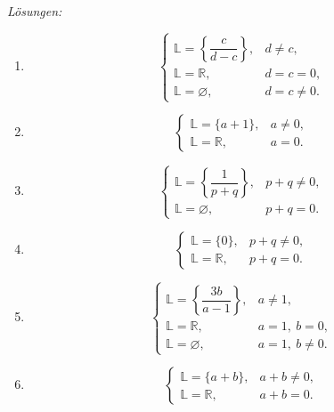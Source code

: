 \clearpage
\emph{Lösungen:}
\begin{enumerate}
    \item
          \[
              \begin{cases}
                  \mathbb{L}=\left\{\dfrac{c}{d-c}\right\}, & d\neq c,  \\[1ex]
                  \mathbb{L}=\mathbb{R},                    & d=c=0,    \\
                  \mathbb{L}=\varnothing,                   & d=c\neq0.
              \end{cases}
          \]

    \item
          \[
              \begin{cases}
                  \mathbb{L}=\{a+1\},    & a\neq0, \\
                  \mathbb{L}=\mathbb{R}, & a=0.
              \end{cases}
          \]

    \item
          \[
              \begin{cases}
                  \mathbb{L}=\left\{\dfrac{1}{p+q}\right\}, & p+q\neq0, \\[1ex]
                  \mathbb{L}=\varnothing,                   & p+q=0.
              \end{cases}
          \]

    \item
          \[
              \begin{cases}
                  \mathbb{L}=\{0\},      & p+q\neq0, \\
                  \mathbb{L}=\mathbb{R}, & p+q=0.
              \end{cases}
          \]

    \item
          \[
              \begin{cases}
                  \mathbb{L}=\left\{\dfrac{3b}{a-1}\right\}, & a\neq1,       \\[1ex]
                  \mathbb{L}=\mathbb{R},                     & a=1,\ b=0,    \\
                  \mathbb{L}=\varnothing,                    & a=1,\ b\neq0.
              \end{cases}
          \]

    \item
          \[
              \begin{cases}
                  \mathbb{L}=\{a+b\},    & a+b\neq0, \\
                  \mathbb{L}=\mathbb{R}, & a+b=0.
              \end{cases}
          \]


\end{enumerate}
